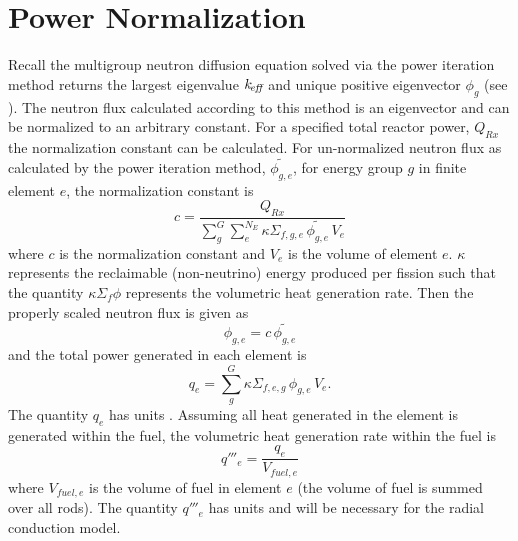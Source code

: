 \section{Power Normalization}
  Recall the multigroup neutron diffusion equation solved via the power
  iteration method returns the largest eigenvalue $k_{\!\mbox{\scriptsize \em eff}}$ and unique positive
  eigenvector $\phi_g$ (see ). The neutron flux
  calculated according to this method is an eigenvector and can be normalized
  to an arbitrary constant. For a specified total reactor power, $Q_{Rx}$ the
  normalization constant can be calculated. For un-normalized neutron flux as
  calculated by the power iteration method, $\widetilde{\phi_{g,e}}$, for  
  energy group $g$ in finite element $e$, the normalization constant is 
  \begin{equation}
    \label{eq:normalization_c}
    c = \frac{Q_{Rx}}{\sum_{g}^{G} \sum_{e}^{N_E} \kappa \Sigma_{f,g,e} \,
      \widetilde{\phi_{g,e}} \, V_e}
  \end{equation}
  where $c$ is the normalization constant and $V_e$ is the volume of element
  $e$. $\kappa$ represents the reclaimable (non-neutrino) energy produced per
  fission such that the quantity $\kappa \Sigma_f \phi$ represents the
  volumetric heat generation rate. 
  Then the properly scaled neutron flux is given as
  \begin{equation}
    \label{eq:normalization_phi}
    \phi_{g,e} = c \, \widetilde{\phi_{g,e}}
  \end{equation}
  and the total power generated in each element is 
  \begin{equation}
    \label{eq:elementpwr}
    q_{e} = \sum_g^G \kappa \Sigma_{f,e,g} \, \phi_{g,e} \, V_e .
  \end{equation}
  The quantity $q_e$ has units . Assuming all heat generated in the
  element is generated within the fuel, the volumetric heat generation rate 
  within the fuel is 
  \begin{equation}
    \label{eq:elementqppp_fuel}
    q'''_{e} = \frac{q_e}{V_{fuel,e}}
  \end{equation}
  where $V_{fuel,e}$ is the volume of fuel in element $e$ (the volume of fuel
  is summed over all rods). The quantity $q'''_e$
  has units  and will be necessary for the 
  radial conduction model.

